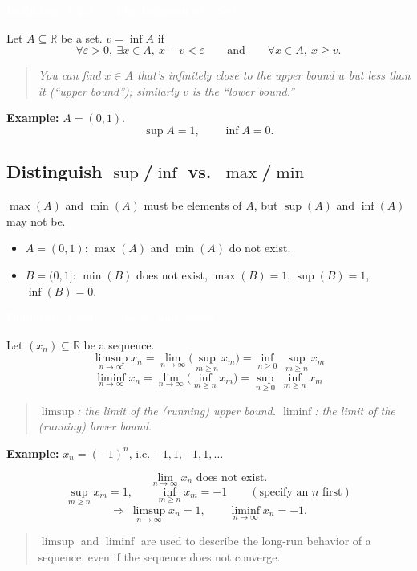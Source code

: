 \documentclass[11pt]{article}
\newcommand{\deftitle}[1]{%
  \vspace{0.6em}
  \noindent\colorbox{defbg!70}{\parbox{\dimexpr\textwidth-2\fboxsep}{\textbf{\textcolor{white}{#1}}}}
  \vspace{0.4em}
}
\newenvironment{note}{\begin{quote}\color{noteblue}\itshape}{\end{quote}}
\newenvironment{remark}{\begin{quote}\color{notepink}}{\end{quote}}
\begin{document}
\deftitle{Definition 1.2.2 --- The Infimum of a Set}

Let $A \subseteq \mathbb{R}$ be a set. $v = \inf A$ if
\[
\forall \varepsilon > 0,\ \exists x \in A,\ x - v < \varepsilon \qquad \text{and} \qquad \forall x \in A,\ x \ge v.
\]

\begin{note}
You can find $x \in A$ that's infinitely close to the upper bound $u$ but less than it (``upper bound''); similarly $v$ is the ``lower bound.''
\end{note}

\noindent \textbf{Example:} $A = (0,1)$.
\[
\sup A = 1, \qquad \inf A = 0.
\]

\subsection*{Distinguish $\sup$/$\inf$ vs.\ $\max$/$\min$}
$\max(A)$ and $\min(A)$ must be elements of $A$, but $\sup(A)$ and $\inf(A)$ may not be.

\begin{itemize}
  \item $A = (0,1)$: $\max(A)$ and $\min(A)$ do not exist.
  \item $B = (0,1]$: $\min(B)$ does not exist, $\max(B) = 1$, $\sup(B) = 1$, $\inf(B) = 0$.
\end{itemize}

\deftitle{Definition 1.2.3 --- $\limsup$ and $\liminf$}

Let $(x_n) \subseteq \mathbb{R}$ be a sequence.
\[
\limsup_{n \to \infty} x_n = \lim_{n \to \infty} \Big(\sup_{m \ge n} x_m\Big) = \inf_{n \ge 0}\ \sup_{m \ge n} x_m
\]
\[
\liminf_{n \to \infty} x_n = \lim_{n \to \infty} \Big(\inf_{m \ge n} x_m\Big) = \sup_{n \ge 0}\ \inf_{m \ge n} x_m
\]

\begin{note}
$\limsup$: the limit of the (running) upper bound. $\liminf$: the limit of the (running) lower bound.
\end{note}

\noindent \textbf{Example:} $x_n = (-1)^n$, i.e. $-1, 1, -1, 1, \ldots$

\[
\lim_{n \to \infty} x_n \text{ does not exist.}
\]
\[
\sup_{m \ge n} x_m = 1, \qquad \inf_{m \ge n} x_m = -1 \qquad (\text{specify an } n \text{ first})
\]
\[
\Rightarrow \ \limsup_{n \to \infty} x_n = 1, \qquad \liminf_{n \to \infty} x_n = -1.
\]

\begin{remark}
$\limsup$ and $\liminf$ are used to describe the long-run behavior of a sequence, even if the sequence does not converge.
\end{remark}
\end{document}
